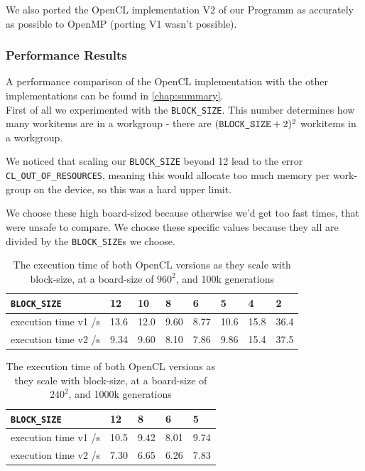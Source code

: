 \documentclass[a4paper,english,12pt,twoside=false]{scrartcl} %
\begin{document}
We also ported the OpenCL implementation V2 of our Programm as accurately as possible to OpenMP (porting V1 wasn't possible).

\subsubsection{Performance Results}

A performance comparison of the OpenCL implementation with the other implementations can be found in \autoref{chap:summary}. \\
First of all we experimented with the \verb|BLOCK_SIZE|.
This number determines how many workitems are in a workgroup - there are $(\verb|BLOCK_SIZE| + 2)^2$ workitems in a workgroup.

We noticed that scaling our \verb|BLOCK_SIZE| beyond 12 lead to the error \verb|CL_OUT_OF_RESOURCES|,
meaning this would allocate too much memory per work-group on the device, so this was a hard upper limit.

We choose these high board-sized because otherwise we'd get too fast times, that were unsafe to compare.
We choose these specific values because they all are divided by the \verb|BLOCK_SIZE|s we choose.

\begin{table}[]
\centering
\begin{tabular}{l||l|l|l|l|l|l|l}
    \verb|BLOCK_SIZE|    & 12   & 10   & 8    & 6    & 5    & 4    & 2    \\ \hline \hline
    execution time v1 /s & 13.6 & 12.0 & 9.60 & 8.77 & 10.6 & 15.8 & 36.4 \\ \hline
    execution time v2 /s & 9.34 & 9.60 & 8.10 & 7.86 & 9.86 & 15.4 & 37.5 \\
\end{tabular}
\caption{The execution time of both OpenCL versions as they scale with block-size, at a board-size of $960^2$, and 100k generations}
\label{tab:blocksize-scaling1}
\end{table}

\begin{table}[]
\centering
\begin{tabular}{l||l|l|l|l}
    \verb|BLOCK_SIZE|    & 12   & 8    & 6    & 5    \\ \hline \hline
    execution time v1 /s & 10.5 & 9.42 & 8.01 & 9.74 \\ \hline
    execution time v2 /s & 7.30 & 6.65 & 6.26 & 7.83 \\
\end{tabular}
\caption{The execution time of both OpenCL versions as they scale with block-size, at a board-size of $240^2$, and 1000k generations}
\label{tab:blocksize-scaling2}
\end{table}
\end{document}
